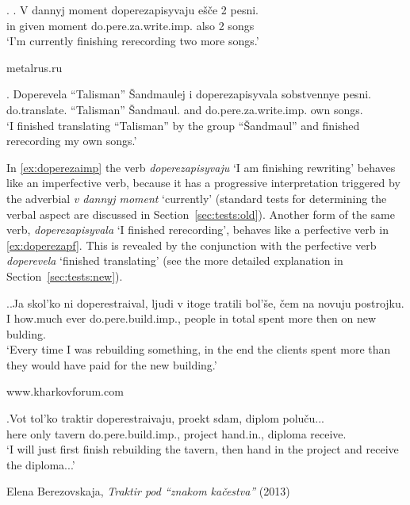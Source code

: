\ex. \ag. \label{ex:doperezaimp}V dannyj moment doperezapisyvaju e\v{s}\v{c}e 2 pesni.\\
in given moment do.pere.za.write.imp. also 2 songs\\
\vspace{0.5em}
`I'm currently finishing rerecording two more songs.'
\begin{flushright}
\vspace{-0.5em}
metalrus.ru
\end{flushright}
\bg. \label{ex:doperezapf}Doperevela ``Talisman'' \v{S}andmaulej i doperezapisyvala sobstvennye pesni.\\
do.translate. ``Talisman'' \v{S}andmaul. and do.pere.za.write.imp. own songs.\\
\vspace{0.5em}
`I finished translating ``Talisman'' by the group ``\v{S}andmaul'' and finished rerecording my own songs.'

In \ref{ex:doperezaimp} the verb \textit{doperezapisyvaju} `I am finishing rewriting' behaves like an imperfective verb, because it has a progressive interpretation triggered by the adverbial \textit{v dannyj moment} `currently' (standard tests for determining the verbal aspect are discussed in Section~\ref{sec:tests:old}). Another form of the same verb, \textit{doperezapisyvala} `I finished rerecording', behaves like a perfective verb in \ref{ex:doperezapf}. This is revealed by the conjunction with the perfective verb \textit{doperevela} `finished translating' (see the more detailed explanation in Section~\ref{sec:tests:new}).

\ex.\ag.\label{ex:dopereimp}Ja skol'ko ni doperestraival, ljudi v itoge tratili bol'\v{s}e, \v{c}em na novuju postrojku.\\
I how.much ever do.pere.build.imp., people in total spent more then on new bulding.\\
\vspace{0.5em}
`Every time I was rebuilding something, in the end the clients spent more than they would have paid for the new building.'
\begin{flushright}
\vspace{-0.5em}
www.kharkovforum.com
\end{flushright}
\bg.\label{ex:doperepf}Vot tol'ko traktir doperestraivaju, proekt sdam, diplom polu\v{c}u...\\
here only tavern do.pere.build.imp., project hand.in., diploma receive.\\
\vspace{0.5em}
`I will just first finish rebuilding the tavern, then hand in the project and receive the diploma...'
\begin{flushright}
\vspace{-0.5em}
Elena Berezovskaja, \textit{Traktir pod ``znakom ka\v{c}estva''} (2013)
\end{flushright}

